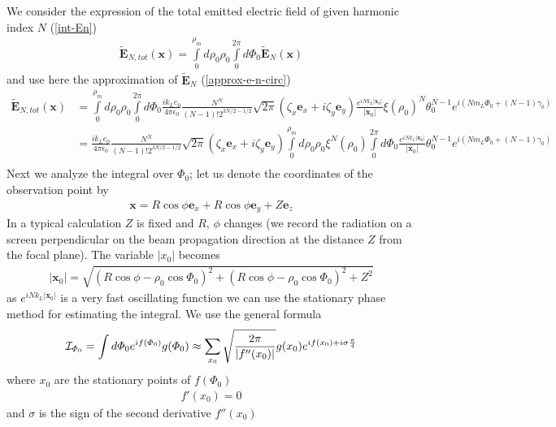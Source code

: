   We consider the expression of the total emitted electric field of given harmonic index $N$ (\ref{int-En})
  \begin{align}
    \tilde {\bm E}_{N,tot}({\bm x})=\int\limits_0^{\rho_m}d\rho_0\rho_0\int\limits_0^{2\pi}d\varPhi_0 \tilde{\bm E}_N({\bm x})
  \end{align}
  and use here the approximation of $\tilde{\bm E}_N$ (\ref{approx-e-n-circ})
  \begin{align}
    \tilde {\bm E}_{N,tot}({\bm x}) & =\int\limits_0^{\rho_m}d\rho_0\rho_0\int\limits_0^{2\pi}d\varPhi_0  \frac{i k_L  e_0}{4\pi\epsilon_0}\frac{N^N}{(N-1)!2^{3N/2-1/2}}\sqrt{2\pi}(\zeta_x{\bm e}_x+i \zeta_y{\bm e}_y)\frac{e^{iNk_L|{\bm x}_0|}}{|{\bm x}_0|}\xi(\rho_0)^N\theta_0^{N-1}e^{i(Nm_L\varPhi_0+(N-1)\gamma_0)}\nonumber \\
    & =\frac{i k_L  e_0}{4\pi\epsilon_0}\frac{N^N}{(N-1)!2^{3N/2-1/2}}\sqrt{2\pi}(\zeta_x{\bm e}_x+i \zeta_y{\bm e}_y)\int\limits_0^{\rho_m}d\rho_0\rho_0\xi^N(\rho_0)\int\limits_0^{2\pi}d\varPhi_0  \frac{e^{iNk_L|{\bm x}_0|}}{|{\bm x}_0|}\theta_0^{N-1}e^{i(Nm_L\varPhi_0+(N-1)\gamma_0)}\nonumber \\
  \end{align}
  Next we analyze  the integral over $\varPhi_0$; let us denote the coordinates of the observation point by
  \begin{align}
    {\bm x}=R\cos\phi{\bm e}_x+R\cos\phi{\bm e}_y+Z{\bm e}_z
  \end{align}
  In a typical calculation $Z$ is fixed and $R$, $\phi$ changes (we record the radiation on a screen perpendicular on the beam propagation direction at the distance $Z$ from the focal plane).
  The variable $|x_0|$  becomes
  \begin{align}
    |{\bm x}_0|=\sqrt{(R\cos\phi-\rho_0\cos\varPhi_0)^2+(R\cos\phi-\rho_0\cos\varPhi_0)^2+Z^2}
  \end{align}
  as $e^{iNk_L|{\bm x}_0|}$ is a very fast oscillating function we can use the stationary phase method for estimating the integral.
  We use the general formula \cite{ref2}
  \begin{align}
    {\cal I}_{\varPhi_0}= \int d\varPhi_0 e^{if(\varPhi_0)} g(\varPhi_0)\approx\sum\limits_{x_0}\sqrt\frac{2\pi}{|f''(x_0)|}g(x_0)e^{if(x_0)+i\sigma\frac{\pi}4}
  \end{align}
  where $x_0$ {are} the stationary points of $f(\varPhi_0)$
  \begin{align}
    f'(x_0)=0
  \end{align}
  and $\sigma$ is the sign of the second derivative $f''(x_0)$

